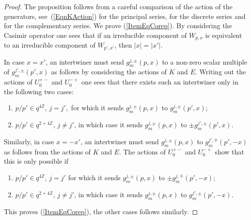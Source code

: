 \documentclass[pdftex]{sigma}
\numberwithin{equation}{section}
\theoremstyle{definition}
\begin{document}
\begin{proof} The proposition follows from a careful comparison of the action of the generators, see~(\ref{EqnKAction}) for the principal series, \cite[Proposition 5.2 and Lemma 10.1]{GroKoeKus} for the discrete series and \cite[Section 10.3]{GroKoeKus} for the complementary series. We prove (\ref{ItemEqCorep}). By considering the Casimir operator \cite[Def\/inition 4.5]{GroKoeKus} one sees that if an irreducible component of $W_{p,x}$ is equivalent to an irreducible component of $W_{p',x'}$, then $\vert x \vert = \vert x' \vert$.

In case $x = x'$, an intertwiner must send $g_m^{j,\pm}(p,x)$ to a non-zero scalar multiple of $g_m^{j',\pm}(p',x)$ as follows by considering the actions of $K$ and $E$. Writing out the actions of $U^{+-}_0$ and $U^{-+}_0$ one sees that there exists such an intertwiner only in the following two cases:
\begin{enumerate}\itemsep=0pt
\item[(i)] $ p/p' \in q^{4 \mathbb{Z}}$, $j =j',$ for which it sends $g_m^{j,\pm}(p,x)$ to  $g_m^{j,\pm}(p',x)$;
\item[(ii)] $ p/p' \in q^{2+ 4 \mathbb{Z}}$, $j \not = j'$, in which case it sends $g_m^{j,\pm}(p,x)$ to  $\pm g_m^{j',\pm}(p',x)$.
\end{enumerate}

 Similarly, in case $x = -x'$, an intertwiner must send $g_m^{j,\pm}(p,x)$ to  $g_m^{j',\mp}(p',-x)$ as follows from the actions of $K$ and $E$. The actions of $U^{+-}_0$ and $U^{-+}_0$ show that this is only possible if
\begin{enumerate}\itemsep=0pt
\item[(i)] $ p/p' \in q^{4 \mathbb{Z}}$, $j =j'$ for which it sends $g_m^{j,\pm}(p,x)$ to  $\pm g_m^{j,\mp}(p',-x)$;
\item[(ii)]  $ p/p' \in q^{2+ 4 \mathbb{Z}}$, $j \not = j'$, in which case it sends $g_m^{j,\pm}(p,x)$ to  $g_m^{j',\pm}(p',-x)$.
\end{enumerate}
This proves (\ref{ItemEqCorep}), the other cases follows similarly.
\end{proof}
\end{document}
